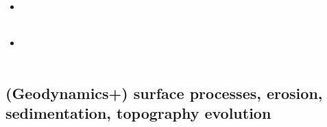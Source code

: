 \begin{scriptsize}
\begin{itemize}
\textcite{dusd18} \\
\textcite{mosp18} \\
\item[\twothousandnineteen] 
\textcite{pact19} \\
\textcite{halk19} \\
\item[\twothousandtwenty] 
\textcite{sams20} \\
\textcite{lahh20} \\
\end{itemize}
\end{scriptsize}

\subsection{(Geodynamics+) surface processes, erosion, sedimentation, topography evolution}

